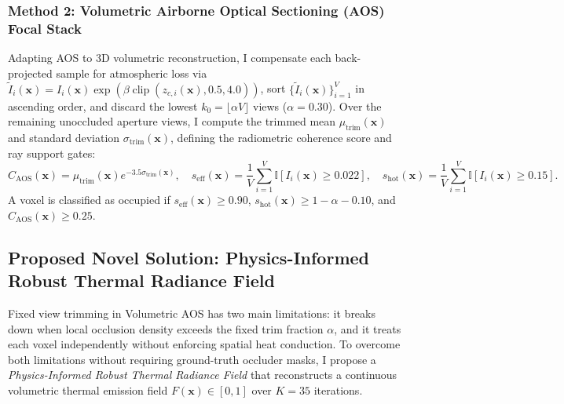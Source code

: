 \documentclass[12pt,letterpaper]{article}
\begin{document}
\subsubsection{Method 2: Volumetric Airborne Optical Sectioning (AOS) Focal Stack}
Adapting AOS \cite{schedl2020search} to 3D volumetric reconstruction, I compensate each back-projected sample for atmospheric loss via $\tilde{I}_i(\mathbf{x}) = I_i(\mathbf{x}) \exp(\beta \operatorname{clip}(z_{c,i}(\mathbf{x}), 0.5, 4.0))$, sort $\{\tilde{I}_i(\mathbf{x})\}_{i=1}^V$ in ascending order, and discard the lowest $k_0 = \lfloor \alpha V \rfloor$ views ($\alpha = 0.30$). Over the remaining unoccluded aperture views, I compute the trimmed mean $\mu_{\text{trim}}(\mathbf{x})$ and standard deviation $\sigma_{\text{trim}}(\mathbf{x})$, defining the radiometric coherence score and ray support gates:
\begin{equation}
  C_{\text{AOS}}(\mathbf{x}) = \mu_{\text{trim}}(\mathbf{x}) e^{-3.5\sigma_{\text{trim}}(\mathbf{x})}, \quad
  s_{\text{eff}}(\mathbf{x}) = \frac{1}{V}\sum_{i=1}^V \mathbb{I}[I_i(\mathbf{x}) \ge 0.022], \quad
  s_{\text{hot}}(\mathbf{x}) = \frac{1}{V}\sum_{i=1}^V \mathbb{I}[I_i(\mathbf{x}) \ge 0.15].
  \label{eq:aos_coherence}
\end{equation}
A voxel is classified as occupied if $s_{\text{eff}}(\mathbf{x}) \ge 0.90$, $s_{\text{hot}}(\mathbf{x}) \ge 1 - \alpha - 0.10$, and $C_{\text{AOS}}(\mathbf{x}) \ge 0.25$.

\subsection{Proposed Novel Solution: Physics-Informed Robust Thermal Radiance Field}
Fixed view trimming in Volumetric AOS has two main limitations: it breaks down when local occlusion density exceeds the fixed trim fraction $\alpha$, and it treats each voxel independently without enforcing spatial heat conduction. To overcome both limitations without requiring ground-truth occluder masks, I propose a \emph{Physics-Informed Robust Thermal Radiance Field} that reconstructs a continuous volumetric thermal emission field $F(\mathbf{x}) \in [0, 1]$ over $K = 35$ iterations.
\end{document}
